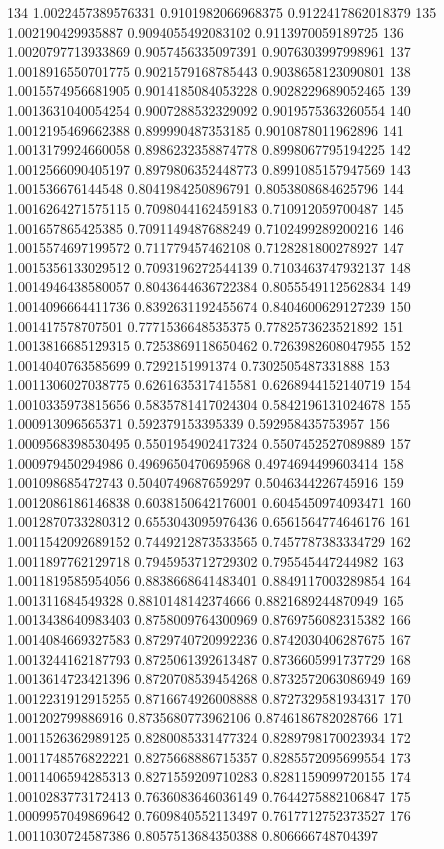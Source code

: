 134	1.0022457389576331	0.9101982066968375	0.9122417862018379
135	1.002190429935887	0.9094055492083102	0.9113970059189725
136	1.0020797713933869	0.9057456335097391	0.9076303997998961
137	1.0018916550701775	0.9021579168785443	0.9038658123090801
138	1.0015574956681905	0.9014185084053228	0.9028229689052465
139	1.0013631040054254	0.9007288532329092	0.9019575363260554
140	1.0012195469662388	0.899990487353185	0.9010878011962896
141	1.0013179924660058	0.8986232358874778	0.8998067795194225
142	1.0012566090405197	0.8979806352448773	0.8991085157947569
143	1.001536676144548	0.8041984250896791	0.8053808684625796
144	1.0016264271575115	0.7098044162459183	0.710912059700487
145	1.001657865425385	0.7091149487688249	0.7102499289200216
146	1.0015574697199572	0.711779457462108	0.7128281800278927
147	1.0015356133029512	0.7093196272544139	0.7103463747932137
148	1.0014946438580057	0.8043644636722384	0.8055549112562834
149	1.0014096664411736	0.8392631192455674	0.8404600629127239
150	1.001417578707501	0.7771536648535375	0.7782573623521892
151	1.0013816685129315	0.7253869118650462	0.7263982608047955
152	1.0014040763585699	0.7292151991374	0.7302505487331888
153	1.0011306027038775	0.6261635317415581	0.6268944152140719
154	1.0010335973815656	0.5835781417024304	0.5842196131024678
155	1.000913096565371	0.592379153395339	0.592958435753957
156	1.0009568398530495	0.5501954902417324	0.5507452527089889
157	1.000979450294986	0.4969650470695968	0.4974694499603414
158	1.001098685472743	0.5040749687659297	0.5046344226745916
159	1.0012086186146838	0.6038150642176001	0.6045450974093471
160	1.0012870733280312	0.6553043095976436	0.6561564774646176
161	1.0011542092689152	0.7449212873533565	0.7457787383334729
162	1.0011897762129718	0.7945953712729302	0.795545447244982
163	1.0011819585954056	0.8838668641483401	0.8849117003289854
164	1.001311684549328	0.8810148142374666	0.8821689244870949
165	1.0013438640983403	0.8758009764300969	0.8769756082315382
166	1.0014084669327583	0.8729740720992236	0.8742030406287675
167	1.0013244162187793	0.8725061392613487	0.8736605991737729
168	1.0013614723421396	0.8720708539454268	0.8732572063086949
169	1.0012231912915255	0.8716674926008888	0.8727329581934317
170	1.001202799886916	0.8735680773962106	0.8746186782028766
171	1.0011526362989125	0.8280085331477324	0.8289798170023934
172	1.0011748576822221	0.8275668886715357	0.8285572095699554
173	1.0011406594285313	0.8271559209710283	0.8281159099720155
174	1.0010283773172413	0.7636083646036149	0.7644275882106847
175	1.0009957049869642	0.7609840552113497	0.7617712752373527
176	1.0011030724587386	0.8057513684350388	0.806666748704397
